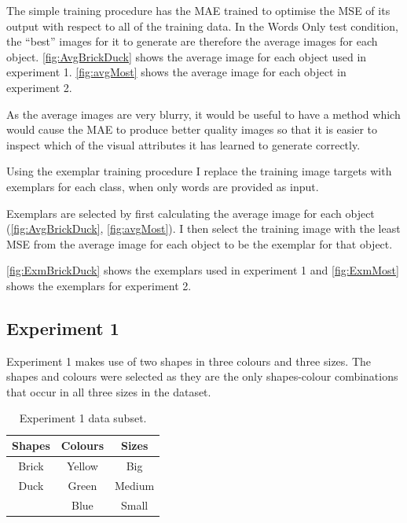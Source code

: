 The simple training procedure has the MAE trained to optimise the MSE of its output with respect to all of the training data. In the Words Only test condition, the ``best'' images for it to generate are therefore the average images for each object. \autoref{fig:AvgBrickDuck} shows the average image for each object used in experiment 1. \autoref{fig:avgMost} shows the average image for each object in experiment 2.

As the average images are very blurry, it would be useful to have a method which would cause the MAE to produce better quality images so that it is easier to inspect which of the visual attributes it has learned to generate correctly.

Using the exemplar training procedure I replace the training image targets with exemplars for each class, when only words are provided as input.

Exemplars are selected by first calculating the average image for each object (\autoref{fig:AvgBrickDuck}, \ref{fig:avgMost}). I then select the training image with the least MSE from the average image for each object to be the exemplar for that object. 

\autoref{fig:ExmBrickDuck} shows the exemplars used in experiment 1 and \autoref{fig:ExmMost} shows the exemplars for experiment 2.



\subsection{Experiment 1}
Experiment 1 makes use of two shapes in three colours and three sizes. The shapes and colours were selected as they are the only shapes-colour combinations that occur in all three sizes in the dataset.

\begin{table}[h]
\centering
\begin{tabular}{|c|c|c|}
\hline

\textbf{Shapes}  & \textbf{Colours} & \textbf{Sizes}\\ \hline \hline
Brick  & Yellow  & Big \\ \hline
Duck   & Green   & Medium \\ \hline
& Blue & Small \\ \hline
			  
			
\end{tabular}
\caption{Experiment 1 data subset.}
\label{tab:6_exp1_data} 
\end{table}

